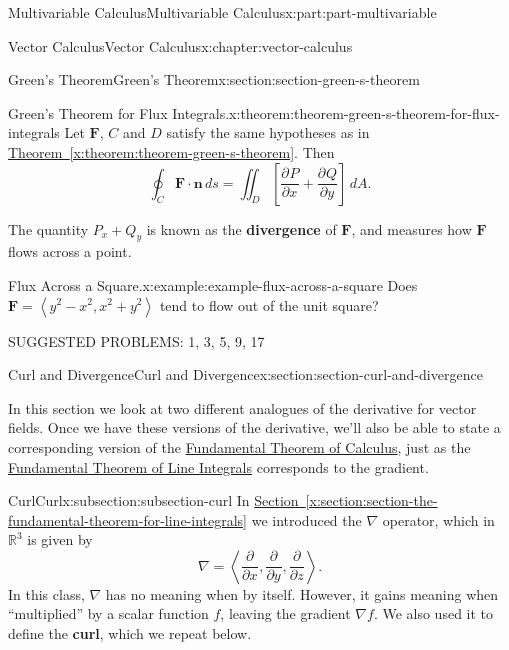\documentclass[twoside,10pt,]{tufte-book}
\newcommand{\xreffont}{\relax}
\newcommand{\terminology}[1]{\textbf{#1}}
\numberwithin{equation}{part}
\newcommand{\RR}{\mathbb{R}}
\newcommand{\grad}{\nabla}
\newcommand{\del}{\nabla}
\newcommand{\vb}[1]{\mathbf{#1}}
\newcommand{\pdv}[3][]{\dfrac{\partial^{#1} #2}{\partial #3^{#1}}}
\newcommand{\dotprod}[1]{\left\langle #1 \right\rangle}
\newcommand{\brackets}[1]{\left[ #1 \right]}
\begin{document}
\begin{partptx}{Multivariable Calculus}{}{Multivariable Calculus}{}{}{x:part:part-multivariable}
\begin{chapterptx}{Vector Calculus}{}{Vector Calculus}{}{}{x:chapter:vector-calculus}
\begin{sectionptx}{Green's Theorem}{}{Green's Theorem}{}{}{x:section:section-green-s-theorem}
\begin{theorem}{Green's Theorem for Flux Integrals.}{}{x:theorem:theorem-green-s-theorem-for-flux-integrals}
%
Let \(\vb{F}\), \(C\) and \(D\) satisfy the same hypotheses as in \hyperref[x:theorem:theorem-green-s-theorem]{Theorem~{\xreffont\ref{x:theorem:theorem-green-s-theorem}}}. Then%
\begin{equation*}
\oint_{C}\vb{F}\cdot\vb{n}\,ds = \iint_{D}\brackets{\pdv{P}{x} + \pdv{Q}{y}}\,dA\text{.}
\end{equation*}
%
\end{theorem}
The quantity \(P_{x} + Q_{y}\) is known as the \terminology{divergence} of \(\vb{F}\), and measures how \(\vb{F}\) flows across a point.%
\begin{example}{Flux Across a Square.}{x:example:example-flux-across-a-square}%
Does \(\vb{F} = \dotprod{y^{2} - x^{2}, x^{2} + y^{2}}\) tend to flow out of the unit square?%
\end{example}
SUGGESTED PROBLEMS: 1, 3, 5, 9, 17%
\end{sectionptx}
%
%
\typeout{************************************************}
\typeout{************************************************}
%
\begin{sectionptx}{Curl and Divergence}{}{Curl and Divergence}{}{}{x:section:section-curl-and-divergence}
\begin{introduction}{}%
In this section we look at two different analogues of the derivative for vector fields. Once we have these versions of the derivative, we'll also be able to state a corresponding version of the \hyperref[x:theorem:theorem-fundamental-theorem-of-calculus]{Fundamental Theorem of Calculus}, just as the \hyperref[x:theorem:theorem-fundamental-theorem-line-integrals]{Fundamental Theorem of Line Integrals} corresponds to the gradient.%
\end{introduction}%
%
%
\typeout{************************************************}
\typeout{************************************************}
%
\begin{subsectionptx}{Curl}{}{Curl}{}{}{x:subsection:subsection-curl}
In \hyperref[x:section:section-the-fundamental-theorem-for-line-integrals]{Section~{\xreffont\ref{x:section:section-the-fundamental-theorem-for-line-integrals}}} we introduced the \(\del\) operator, which in \(\RR^{3}\) is given by%
\begin{equation*}
\del = \dotprod{\pdv{}{x}, \pdv{}{y}, \pdv{}{z}}\text{.}
\end{equation*}
In this class, \(\del\) has no meaning when by itself. However, it gains meaning when ``multiplied'' by a scalar function \(f\), leaving the gradient \(\grad f\). We also used it to define the \terminology{curl}, which we repeat below.%

\end{subsectionptx}
\end{sectionptx}
\end{chapterptx}
\end{partptx}
\end{document}
